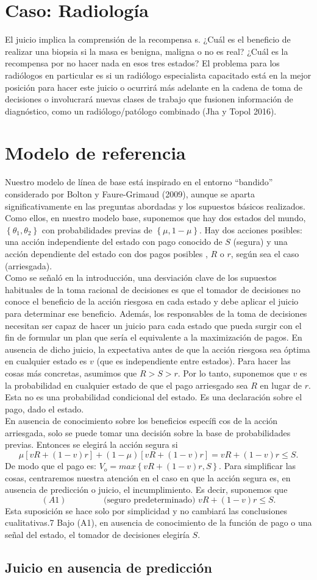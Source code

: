 \section{Caso: Radiología}
El juicio implica la comprensión de la recompensa s. ¿Cuál es el beneficio de realizar una biopsia si la masa es benigna, maligna o no es real? ¿Cuál es la recompensa por no hacer nada en esos tres estados? El problema para los radiólogos en particular es si un radiólogo especialista capacitado está en la mejor posición para hacer este juicio o ocurrirá más adelante en la cadena de toma de decisiones o involucrará nuevas clases de trabajo que fusionen información de diagnóstico, como un radiólogo/patólogo combinado (Jha y Topol 2016).

\section{Modelo de referencia}
Nuestro modelo de línea de base está inspirado en el entorno “bandido” considerado por Bolton y Faure-Grimaud (2009), aunque se aparta significativamente en las preguntas abordadas y los supuestos básicos realizados. Como ellos, en nuestro modelo base, suponemos que hay dos estados del mundo, $\left\{ \theta_1, \theta_2\right\}$ con probabilidades previas de $\left\{ \mu,1 - \mu\right\}$. Hay dos acciones posibles: una acción independiente del estado con pago conocido de $S$ (segura) y una acción dependiente del estado con dos pagos posibles , $R$ o $r$, según sea el caso (arriesgada).\\
Como se señaló en la introducción, una desviación clave de los supuestos habituales de la toma racional de decisiones es que el tomador de decisiones no conoce el beneficio de la acción riesgosa en cada estado y debe aplicar el juicio para determinar ese beneficio. Además, los responsables de la toma de decisiones necesitan ser capaz de hacer un juicio para cada estado que pueda surgir con el fin de formular un plan que sería el equivalente a la maximización de pagos. En ausencia de dicho juicio, la expectativa  antes de que la acción riesgosa sea óptima en cualquier estado es $v$ (que es independiente entre estados). Para hacer las cosas más concretas, asumimos que $R > S > r$.  Por lo tanto, suponemos que $v$ es la probabilidad en cualquier estado de que el pago arriesgado sea $R$ en lugar de $r$. Esta no es una probabilidad condicional del estado. Es una declaración sobre el pago, dado el estado.\\
En ausencia de conocimiento sobre los beneficios específi cos de la acción arriesgada, solo se puede tomar una decisión sobre la base de probabilidades previas. Entonces se elegirá la acción segura si
$$\mu\left[vR+(1-v)r\right]+(1-\mu)\left[vR+(1-v)r\right]=vR+(1-v)r\leq S.$$
De modo que el pago es: $V_o=max\left\{vR+(1-v)r,S\right\}$. Para simplificar las cosas, centraremos nuestra atención en el caso en que la acción segura es, en ausencia de predicción o juicio, el incumplimiento. Es decir, suponemos que
$$(A1)\qquad \qquad \mbox{ (seguro predeterminado) } vR+(1-v)r\leq S.$$
Esta suposición se hace solo por simplicidad y no cambiará las conclusiones cualitativas.7 Bajo (A1), en ausencia de conocimiento de la función de pago o una señal del estado, el tomador de decisiones elegiría $S$.

\subsection{Juicio en ausencia de predicción}
